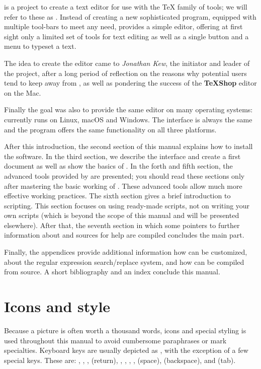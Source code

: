 \textbf{\Tw} is a project to create a text editor for use with the {\TeX} family of tools; we will refer to these as \AllTeX. Instead of creating a new sophisticated program, equipped with multiple tool-bars to meet any need, {\Tw} provides a simple editor, offering at first sight only a limited set of tools for text editing as well as a single button and a menu to typeset a {\AllTeX} text.

The idea to create the editor came to \emph{Jonathan Kew}, the initiator and leader of the project, after a long period of reflection on the reasons why potential users tend to keep away from \AllTeX, as well as pondering the success of the \textbf{{\TeX}Shop} editor on the Mac.

Finally the goal was also to provide the same editor on many operating systems: {\Tw} currently runs on Linux, macOS and Windows. The interface is always the same and the program offers the same functionality on all three platforms.

After this introduction, the second section of this manual explains how to install the software. In the third section, we describe the interface and create a first document as well as show the basics of {\Tw}. In the forth and fifth section, the advanced tools provided by {\Tw} are presented; you should read these sections only after mastering the basic working of {\Tw}. These advanced tools allow much more effective working practices. The sixth section gives a brief introduction to scripting. This section focuses on using ready-made scripts, not on writing your own scripts (which is beyond the scope of this manual and will be presented elsewhere). After that, the seventh section in which some pointers to further information about {\Tw} and sources for help are compiled concludes the main part.

Finally, the appendices provide additional information how {\Tw} can be customized, about the regular expression search/replace system, and how {\Tw} can be compiled from source. A short bibliography and an index conclude this manual.

\section{Icons and style}

Because a picture is often worth a thousand words, icons and special styling is used throughout this manual to avoid cumbersome paraphrases or mark specialties. Keyboard keys are usually depicted as , with the exception of a few special keys. These are:
, , ,  (return), , , , ,  (space),  (backspace), and  (tab).

